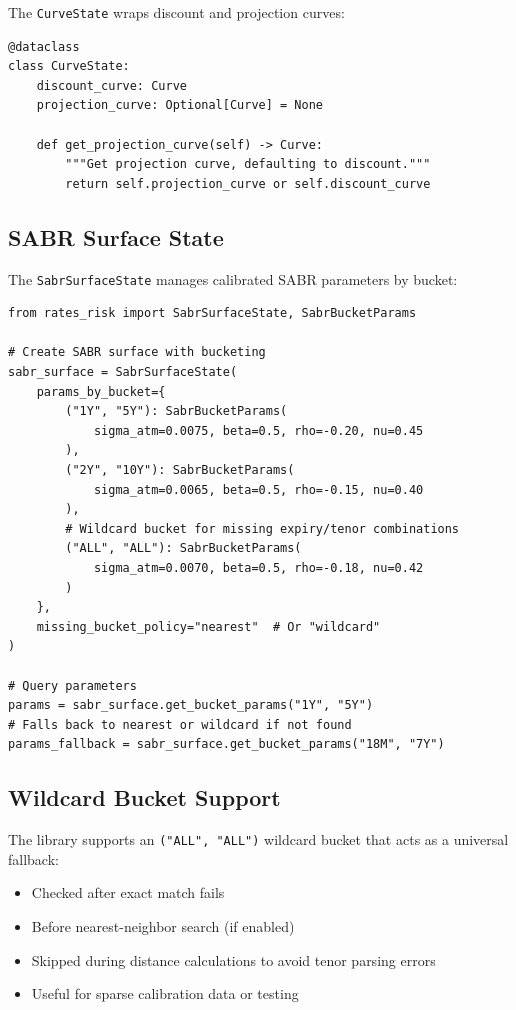 \documentclass[12pt,a4paper]{report}
\newcommand{\code}[1]{\texttt{#1}}
\begin{document}
The \code{CurveState} wraps discount and projection curves:

\begin{lstlisting}
@dataclass
class CurveState:
    discount_curve: Curve
    projection_curve: Optional[Curve] = None
    
    def get_projection_curve(self) -> Curve:
        """Get projection curve, defaulting to discount."""
        return self.projection_curve or self.discount_curve
\end{lstlisting}

\subsection{SABR Surface State}

The \code{SabrSurfaceState} manages calibrated SABR parameters by bucket:

\begin{lstlisting}
from rates_risk import SabrSurfaceState, SabrBucketParams

# Create SABR surface with bucketing
sabr_surface = SabrSurfaceState(
    params_by_bucket={
        ("1Y", "5Y"): SabrBucketParams(
            sigma_atm=0.0075, beta=0.5, rho=-0.20, nu=0.45
        ),
        ("2Y", "10Y"): SabrBucketParams(
            sigma_atm=0.0065, beta=0.5, rho=-0.15, nu=0.40
        ),
        # Wildcard bucket for missing expiry/tenor combinations
        ("ALL", "ALL"): SabrBucketParams(
            sigma_atm=0.0070, beta=0.5, rho=-0.18, nu=0.42
        )
    },
    missing_bucket_policy="nearest"  # Or "wildcard"
)

# Query parameters
params = sabr_surface.get_bucket_params("1Y", "5Y")
# Falls back to nearest or wildcard if not found
params_fallback = sabr_surface.get_bucket_params("18M", "7Y")
\end{lstlisting}

\subsection{Wildcard Bucket Support}

The library supports an \code{("ALL", "ALL")} wildcard bucket that acts as a universal fallback:

\begin{itemize}
    \item Checked after exact match fails
    \item Before nearest-neighbor search (if enabled)
    \item Skipped during distance calculations to avoid tenor parsing errors
    \item Useful for sparse calibration data or testing
\end{itemize}
\end{document}
